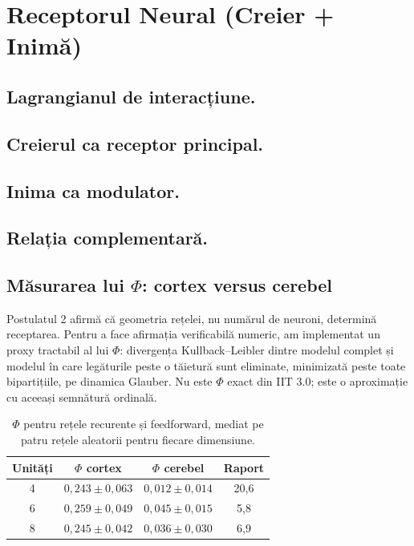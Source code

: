 \documentclass[11pt,a4paper]{article}
\begin{document}
\section{Receptorul Neural (Creier + Inimă)}
\subsection{Lagrangianul de interacțiune.}
\subsection{Creierul ca receptor principal.}
\subsection{Inima ca modulator.}
\subsection{Relația complementară.}

\subsection{Măsurarea lui \texorpdfstring{$\Phi$}{Phi}: cortex versus cerebel}
Postulatul 2 afirmă că geometria rețelei, nu numărul de neuroni, determină receptarea. Pentru a face afirmația verificabilă numeric, am implementat un proxy tractabil al lui $\Phi$: divergența Kullback--Leibler dintre modelul complet și modelul în care legăturile peste o tăietură sunt eliminate, minimizată peste toate bipartițiile, pe dinamica Glauber. Nu este $\Phi$ exact din IIT 3.0; este o aproximație cu aceeași semnătură ordinală.

\begin{table}[H]
\centering
\begin{tabular}{@{}cccc@{}}
\toprule
Unități & $\Phi$ cortex & $\Phi$ cerebel & Raport \\ \midrule
4 & $0{,}243 \pm 0{,}063$ & $0{,}012 \pm 0{,}014$ & 20{,}6 \\
6 & $0{,}259 \pm 0{,}049$ & $0{,}045 \pm 0{,}015$ & 5{,}8 \\
8 & $0{,}245 \pm 0{,}042$ & $0{,}036 \pm 0{,}030$ & 6{,}9 \\ \bottomrule
\end{tabular}
\caption{$\Phi$ pentru rețele recurente și feedforward, mediat pe patru rețele aleatorii pentru fiecare dimensiune.}
\label{tab:phi}
\end{table}
\end{document}
